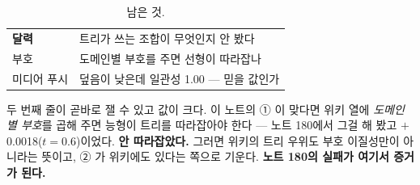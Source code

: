 \documentclass[10pt]{article}
\begin{document}
\begin{table}[t]
\centering\tsize
\caption{남은 것.}
\begin{tabular}{ll}
\toprule
\textbf{달력} & 트리가 쓰는 조합이 무엇인지 안 봤다 \\
부호 & 도메인별 부호를 주면 선형이 따라잡나 \\
미디어 푸시 & 덮음이 낮은데 일관성 1.00 --- 믿을 값인가 \\
\bottomrule
\end{tabular}
\end{table}

두 번째 줄이 곧바로 잴 수 있고 값이 크다. 이 노트의 ① 이 맞다면 위키
열에 \emph{도메인별 부호}를 곱해 주면 능형이 트리를 따라잡아야 한다 ---
노트 180에서 그걸 해 봤고 $+$0.0018($t{=}0.6$)이었다. \textbf{안 따라잡았다.}
그러면 위키의 트리 우위도 부호 이질성만이 아니라는 뜻이고, ② 가 위키에도
있다는 쪽으로 기운다. \textbf{노트 180의 실패가 여기서 증거가 된다.}
\end{document}
